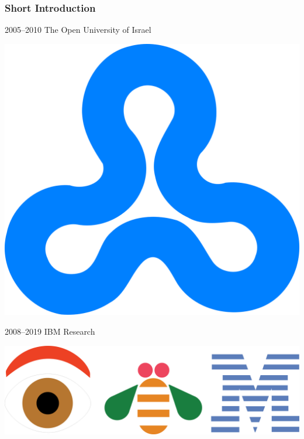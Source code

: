 \documentclass[t,xcolor={svgnames,table}]{beamer}
\begin{document}
\begin{frame}
\frametitle{Short Introduction}
\begin{minipage}{.7\textwidth}
2005--2010 The Open University of Israel
\end{minipage}
\begin{minipage}{.1\textwidth}
\includegraphics[width=\textwidth]{Open_university_israel_logo.png}
\end{minipage}

\vfill

\begin{minipage}{.7\textwidth}
2008--2019 IBM Research
\end{minipage}
\begin{minipage}{.125\textwidth}
\includegraphics[width=\textwidth]{eye_bee_m.png}
\end{minipage}

\vfill


\end{frame}
\end{document}
